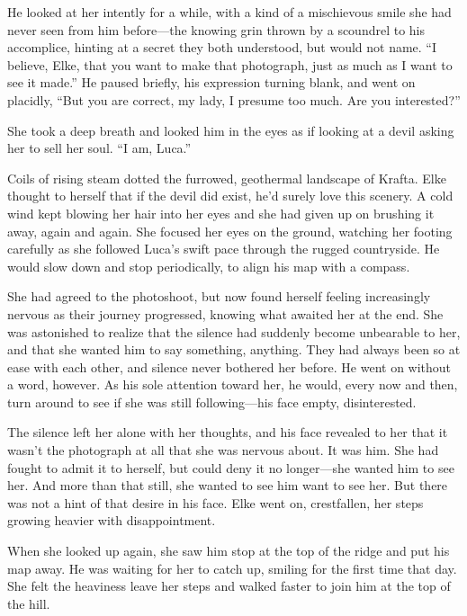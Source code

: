 He looked at her intently for a while, with a kind of a mischievous smile she had never seen from him before---the knowing grin thrown by a scoundrel to his accomplice, hinting at a secret they both understood, but would not name. ``I believe, Elke, that you want to make that photograph, just as much as I want to see it made.'' He paused briefly, his expression turning blank, and went on placidly, ``But you are correct, my lady, I presume too much. Are you interested?''

She took a deep breath and looked him in the eyes as if looking at a devil asking her to sell her soul. ``I am, Luca.''

\sectionline

Coils of rising steam dotted the furrowed, geothermal landscape of Krafta. Elke thought to herself that if the devil did exist, he'd surely love this scenery. A cold wind kept blowing her hair into her eyes and she had given up on brushing it away, again and again. She focused her eyes on the ground, watching her footing carefully as she followed Luca's swift pace through the rugged countryside. He would slow down and stop periodically, to align his map with a compass.

She had agreed to the photoshoot, but now found herself feeling increasingly nervous as their journey progressed, knowing what awaited her at the end. She was astonished to realize that the silence had suddenly become unbearable to her, and that she wanted him to say something, anything. They had always been so at ease with each other, and silence never bothered her before. He went on without a word, however. As his sole attention toward her, he would, every now and then, turn around to see if she was still following---his face empty, disinterested.

The silence left her alone with her thoughts, and his face revealed to her that it wasn't the photograph at all that she was nervous about. It was him. She had fought to admit it to herself, but could deny it no longer---she wanted him to see her. And more than that still, she wanted to see him want to see her. But there was not a hint of that desire in his face. Elke went on, crestfallen, her steps growing heavier with disappointment.

When she looked up again, she saw him stop at the top of the ridge and put his map away. He was waiting for her to catch up, smiling for the first time that day. She felt the heaviness leave her steps and walked faster to join him at the top of the hill.

